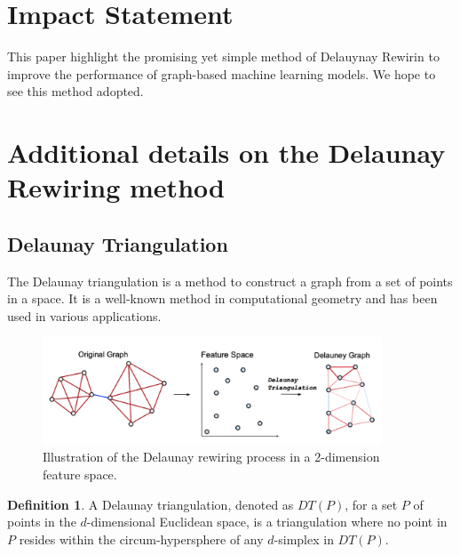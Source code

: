 \documentclass{article}
\theoremstyle{plain}
\theoremstyle{definition}
\newtheorem{definition}[theorem]{Definition}
\theoremstyle{remark}
\begin{document}
\section*{Impact Statement}

This paper highlight the promising yet simple method of Delauynay Rewirin to 
improve the performance of graph-based machine learning models.
We hope to see this method adopted.







\newpage
\appendix
\onecolumn


\section{Additional details on the Delaunay Rewiring method}
\subsection{Delaunay Triangulation}
The Delaunay triangulation is a method to construct a graph from a set of points in a space.
It is a well-known method in computational geometry and has been used in various applications.

\label{app:delaunay}
\begin{figure}[h!]
    \center

    \includegraphics[width=0.9\textwidth]{figures/delaunay_process.png}
    \caption{Illustration of the Delaunay rewiring process in a 2-dimension feature space.}
    \label{fig:delaunay_full}
\end{figure}
\begin{definition}
    \label{def:delaunay}
A Delaunay triangulation, denoted as $DT(P)$, for a set $P$ of points 
        in the $d$-dimensional Euclidean space, is a triangulation where no 
        point in $P$ resides within the circum-hypersphere of any $d$-simplex 
        in $DT(P)$.
    \end{definition}
\end{document}
